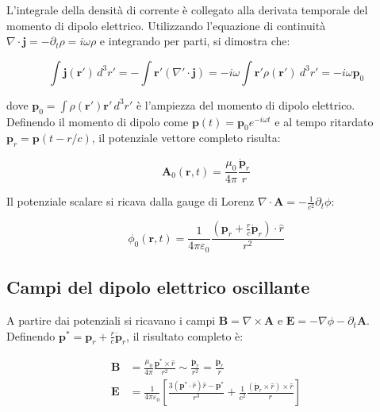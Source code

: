 L'integrale della densità di corrente è collegato alla derivata temporale del momento di dipolo elettrico. Utilizzando l'equazione di continuità $\nabla \cdot \mathbf{j} = -\partial_t \rho = i\omega\rho$ e integrando per parti, si dimostra che:

\begin{equation}
    \int \mathbf{j}(\mathbf{r'}) \, d^3r' = -\int \mathbf{r}' (\nabla' \cdot \mathbf{j}) = -i\omega \int \mathbf{r}' \rho(\mathbf{r}') \ d^3 r' = -i\omega \mathbf{p}_0
\end{equation}

dove $\mathbf{p}_0 = \int \rho(\mathbf{r'}) \mathbf{r'} \, d^3r'$ è l'ampiezza del momento di dipolo elettrico. Definendo il momento di dipolo come $\mathbf{p}(t) = \mathbf{p}_0 e^{-i\omega t}$ e al tempo ritardato $\mathbf{p}_r = \mathbf{p}(t - r/c)$, il potenziale vettore completo risulta:

\begin{tcolorbox}[colback=yellow!10!white, colframe=orange!70!black,boxrule=0.8pt]
\begin{equation}\label{eq: potenziale_vettore_dipolo}
    \mathbf{A}_0(\mathbf{r}, t) = \frac{\mu_0}{4\pi} 
    \frac{\dot{\mathbf{p}}_r}{r}
\end{equation}
\end{tcolorbox}

Il potenziale scalare si ricava dalla gauge di Lorenz $\nabla \cdot \mathbf{A} = -\frac{1}{c^2}\partial_t \phi$:

\begin{tcolorbox}[colback=yellow!10!white, colframe=orange!70!black, boxrule=0.8pt]
\begin{equation}
    \phi_0(\mathbf{r}, t) = \frac{1}{4\pi\varepsilon_0} 
    \frac{(\mathbf{p}_r + \frac{r}{c}\dot{\mathbf{p}}_r)\cdot\hat{r}}{r^2}
\end{equation}
\end{tcolorbox}

\subsection{Campi del dipolo elettrico oscillante}

A partire dai potenziali si ricavano i campi $\mathbf{B} = \nabla \times \mathbf{A}$ e $\mathbf{E} = -\nabla\phi - \partial_t \mathbf{A}$. 
Definendo $\mathbf{p}^* = \mathbf{p}_r + \frac{r}{c}\dot{\mathbf{p}}_r$, il risultato completo è:

\begin{tcolorbox}[colback=yellow!10!white, colframe=orange!70!black, 
boxrule=0.8pt]
\begin{align}
    \mathbf{B} &= \frac{\mu_0}{4\pi} 
    \frac{\mathbf{p}^* \times \hat{r}}{r^2} 
    \sim \frac{\dot{\mathbf{p}}_r}{r^2} = \frac{\ddot{\mathbf{p}}_r}{r} 
    \label{eq: B_dipolo}\\[8pt]
    \mathbf{E} &= \frac{1}{4\pi\varepsilon_0} \left[ 
    \frac{3(\mathbf{p}^*\cdot\hat{r})\hat{r} - \mathbf{p}^*}{r^3} 
    + \frac{1}{c^2} 
    \frac{(\ddot{\mathbf{p}}_r \times \hat{r}) \times \hat{r}}{r}
    \right] \label{eq: E_dipolo}
\end{align}
\end{tcolorbox}


